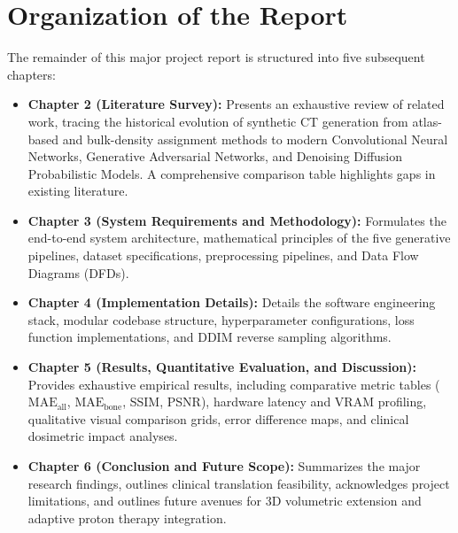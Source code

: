 \section{Organization of the Report}
The remainder of this major project report is structured into five subsequent chapters:
\begin{itemize}
    \item \textbf{Chapter 2 (Literature Survey):} Presents an exhaustive review of related work, tracing the historical evolution of synthetic CT generation from atlas-based and bulk-density assignment methods to modern Convolutional Neural Networks, Generative Adversarial Networks, and Denoising Diffusion Probabilistic Models. A comprehensive comparison table highlights gaps in existing literature.
    \item \textbf{Chapter 3 (System Requirements and Methodology):} Formulates the end-to-end system architecture, mathematical principles of the five generative pipelines, dataset specifications, preprocessing pipelines, and Data Flow Diagrams (DFDs).
    \item \textbf{Chapter 4 (Implementation Details):} Details the software engineering stack, modular codebase structure, hyperparameter configurations, loss function implementations, and DDIM reverse sampling algorithms.
    \item \textbf{Chapter 5 (Results, Quantitative Evaluation, and Discussion):} Provides exhaustive empirical results, including comparative metric tables ($\text{MAE}_{\text{all}}$, $\text{MAE}_{\text{bone}}$, SSIM, PSNR), hardware latency and VRAM profiling, qualitative visual comparison grids, error difference maps, and clinical dosimetric impact analyses.
    \item \textbf{Chapter 6 (Conclusion and Future Scope):} Summarizes the major research findings, outlines clinical translation feasibility, acknowledges project limitations, and outlines future avenues for 3D volumetric extension and adaptive proton therapy integration.
\end{itemize}
